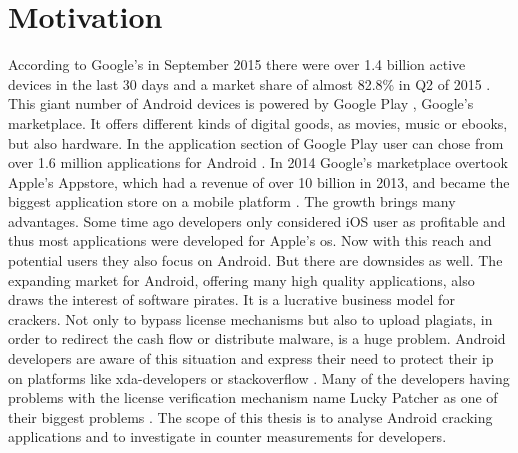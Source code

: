 \section{Motivation}\label{section:introduction-motivation}
According to Google's in September 2015 there were over 1.4 billion active devices in the last 30 days and a market share of almost 82.8\% in Q2 of 2015 \cite{androidDevices}\cite{androidShare}.
This giant number of Android devices is powered by Google Play \cite{googlePlay}, Google's marketplace.
It offers different kinds of digital goods, as movies, music or ebooks, but also hardware.
In the application section of Google Play user can chose from over 1.6 million applications for Android \cite{statistaAppStore}.
In 2014 Google's marketplace overtook Apple's Appstore, which had a revenue of over 10 billion in 2013, and became the biggest application store on a mobile platform \cite{wiwoValue}.
\newline
The growth brings many advantages.
Some time ago developers only considered iOS user as profitable and thus most applications were developed for Apple's \gls{os}.
Now with this reach and potential users they also focus on Android\cite{businessProfit}.
But there are downsides as well.
The expanding market for Android, offering many high quality applications, also draws the interest of software pirates.
It is a lucrative business model for crackers. Not only to bypass license mechanisms but also to upload plagiats, in order to redirect the cash flow or distribute malware, is a huge problem.
Android developers are aware of this situation \cite{developersPiracy} and express their need to protect their \gls{ip} on platforms like xda-developers \cite{xdaPiracy} or stackoverflow \cite{stackoverflowPiracy}.
Many of the developers having problems with the license verification mechanism name Lucky Patcher as one of their biggest problems \cite{stackoverflowLucky}.
\newline
\newline
The scope of this thesis is to analyse Android cracking applications and to investigate in counter measurements for developers.




